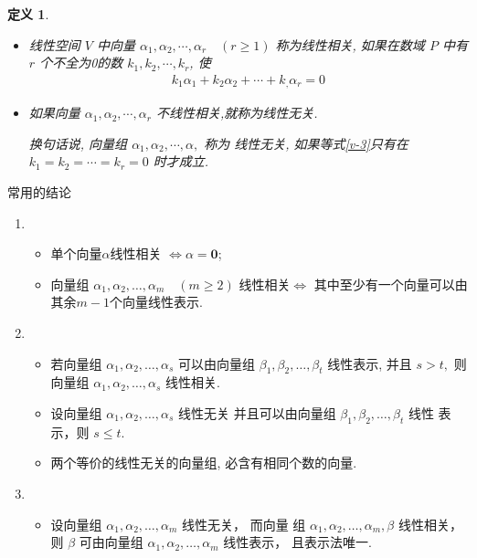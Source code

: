 \documentclass[13pt]{beamer}
\newtheorem*{defi}{定义}
\def\0{\mathbf{0}}
\begin{document}
\begin{frame}
\begin{defi}
\begin{itemize}
\item 线性空间 $V$ 中向量 ${\alpha}_{1}, {\alpha}_{2}, \cdots, {\alpha}_{r}\quad (r \geqslant 1)$ 称为\alert{线性相关}, 如果在数域 $P$ 中有 $r$ 个不全为0的数 $k_{1}, k_{2}, \cdots, k_{r}$, 使
\begin{align}\label{v-3}
k_{1} {\alpha}_{1}+k_{2} {\alpha}_{2}+\cdots+k_{,} {\alpha}_{r}={0}
\end{align}
\item 如果向量 ${\alpha}_{1}, {\alpha}_{2}, \cdots, {\alpha}_{r}$ 不线性相关,就称为\alert{线性无关}.

换句话说,
向量组 ${\alpha}_{1}, {\alpha}_{2}, \cdots, {\alpha},$ 称为 {线性无关}, 如果等式\eqref{v-3}只有在 $k_{1}=k_{2}=\cdots=k_{r}=0$ 时才成立.
\end{itemize}
\end{defi}
\end{frame}

\begin{frame}
常用的结论
\begin{enumerate}

\item \begin{itemize}
\item 单个向量$\alpha$线性相关 $\Leftrightarrow  \alpha= \0$;
\item 向量组 $\alpha_{1}, \alpha_{2}, \ldots, \alpha_{m}\quad  ({m} \geq 2)$ 线性相关$\Leftrightarrow$ 其中至少有一个向量可以由 其余$m-1$个向量线性表示.
\end{itemize}
\vskip 10pt

\item 
\begin{itemize}
\item 
若向量组 $\alpha_{1}, \alpha_{2}, \dots, \alpha_{s}$ 可以由向量组
$\beta_{1}, \beta_{2}, \ldots, \beta_{t}$ 线性表示,  并且 $s>t,$ 则
向量组 $\alpha_{1}, \alpha_{2}, \dots, \alpha_{s}$ 线性相关.

\item  设向量组 $\alpha_{1}, \alpha_{2}, \dots, \alpha_{s}$ 线性无关
并且可以由向量组 $\beta_{1}, \beta_{2}, \ldots, \beta_{t}$ 线性 表示，则 $s \leq t$.

\item 两个等价的线性无关的向量组, 必含有\alert{相同}个数的向量.
\end{itemize}
\vskip 10pt


\item
\begin{itemize}
\item 设向量组 $\alpha_{1}, \alpha_{2}, \ldots, \alpha_{m}$ 线性无关，
而向量 组 $\alpha_{1}, \alpha_{2}, \ldots, \alpha_{m}, \beta$ 线性相关，
则 $\beta$ 可由向量组 $\alpha_{1}, \alpha_{2}, \ldots, \alpha_{m}$ 线性表示，
且表示法\alert{唯一}.
\end{itemize}

\end{enumerate}
\end{frame}
\end{document}
